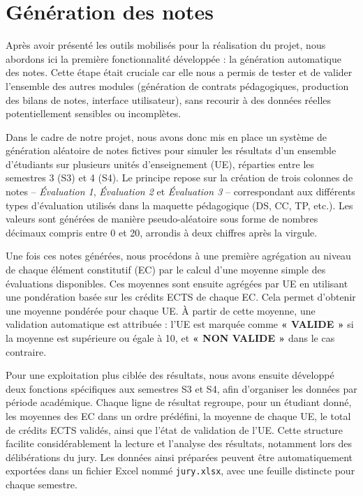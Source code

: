 \documentclass{article}
\begin{document}
\section{Génération des notes}

Après avoir présenté les outils mobilisés pour la réalisation du projet, nous abordons ici la première fonctionnalité développée : la génération automatique des notes. Cette étape était cruciale car elle nous a permis de tester et de valider l’ensemble des autres modules (génération de contrats pédagogiques, production des bilans de notes, interface utilisateur), sans recourir à des données réelles potentiellement sensibles ou incomplètes.

Dans le cadre de notre projet, nous avons donc mis en place un système de génération aléatoire de notes fictives pour simuler les résultats d’un ensemble d’étudiants sur plusieurs unités d’enseignement (UE), réparties entre les semestres 3 (S3) et 4 (S4). Le principe repose sur la création de trois colonnes de notes – \textit{Évaluation 1}, \textit{Évaluation 2} et \textit{Évaluation 3} – correspondant aux différents types d’évaluation utilisés dans la maquette pédagogique (DS, CC, TP, etc.). Les valeurs sont générées de manière pseudo-aléatoire sous forme de nombres décimaux compris entre 0 et 20, arrondis à deux chiffres après la virgule.

Une fois ces notes générées, nous procédons à une première agrégation au niveau de chaque élément constitutif (EC) par le calcul d’une moyenne simple des évaluations disponibles. Ces moyennes sont ensuite agrégées par UE en utilisant une pondération basée sur les crédits ECTS de chaque EC. Cela permet d’obtenir une moyenne pondérée pour chaque UE. À partir de cette moyenne, une validation automatique est attribuée : l’UE est marquée comme \textbf{« VALIDE »} si la moyenne est supérieure ou égale à 10, et \textbf{« NON VALIDE »} dans le cas contraire.

Pour une exploitation plus ciblée des résultats, nous avons ensuite développé deux fonctions spécifiques aux semestres S3 et S4, afin d’organiser les données par période académique. Chaque ligne de résultat regroupe, pour un étudiant donné, les moyennes des EC dans un ordre prédéfini, la moyenne de chaque UE, le total de crédits ECTS validés, ainsi que l’état de validation de l’UE. Cette structure facilite considérablement la lecture et l’analyse des résultats, notamment lors des délibérations du jury. Les données ainsi préparées peuvent être automatiquement exportées dans un fichier Excel nommé \texttt{jury.xlsx}, avec une feuille distincte pour chaque semestre.
\end{document}
